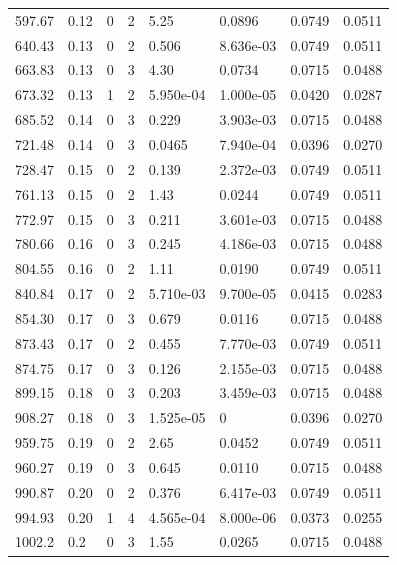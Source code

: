 \documentclass[preview]{standalone}
\begin{document}
{{{\begin{tabular}{L{1.2cm}C{1.2cm} C{0.3cm}C{0.5cm} C{1.4cm}C{1.4cm} C{1.4cm}C{1.4cm}}
  597.67  &  0.12  & 0     &  2 &  5.25  & 0.0896  & 0.0749 &  0.0511   \\ 
  640.43  &  0.13  & 0     &  2 &  0.506  & 8.636e-03  & 0.0749 &  0.0511   \\ 
  663.83  &  0.13  & 0     &  3 &  4.30  & 0.0734  & 0.0715 &  0.0488   \\ 
  673.32  &  0.13  & 1     &  2 &  5.950e-04  & 1.000e-05  & 0.0420 &  0.0287   \\ 
  685.52  &  0.14  & 0     &  3 &  0.229  & 3.903e-03  & 0.0715 &  0.0488   \\ 
  721.48  &  0.14  & 0     &  3 &  0.0465  & 7.940e-04  & 0.0396 &  0.0270   \\ 
  728.47  &  0.15  & 0     &  2 &  0.139  & 2.372e-03  & 0.0749 &  0.0511   \\ 
  761.13  &  0.15  & 0     &  2 &  1.43  & 0.0244  & 0.0749 &  0.0511   \\ 
  772.97  &  0.15  & 0     &  3 &  0.211  & 3.601e-03  & 0.0715 &  0.0488   \\ 
  780.66  &  0.16  & 0     &  3 &  0.245  & 4.186e-03  & 0.0715 &  0.0488   \\ 
  804.55  &  0.16  & 0     &  2 &  1.11  & 0.0190  & 0.0749 &  0.0511   \\ 
  840.84  &  0.17  & 0     &  2 &  5.710e-03  & 9.700e-05  & 0.0415 &  0.0283   \\ 
  854.30  &  0.17  & 0     &  3 &  0.679  & 0.0116  & 0.0715 &  0.0488   \\ 
  873.43  &  0.17  & 0     &  2 &  0.455  & 7.770e-03  & 0.0749 &  0.0511   \\ 
  874.75  &  0.17  & 0     &  3 &  0.126  & 2.155e-03  & 0.0715 &  0.0488   \\ 
  899.15  &  0.18  & 0     &  3 &  0.203  & 3.459e-03  & 0.0715 &  0.0488   \\ 
  908.27  &  0.18  & 0     &  3 &  1.525e-05  & 0  & 0.0396 &  0.0270   \\ 
  959.75  &  0.19  & 0     &  2 &  2.65  & 0.0452  & 0.0749 &  0.0511   \\ 
  960.27  &  0.19  & 0     &  3 &  0.645  & 0.0110  & 0.0715 &  0.0488   \\ 
  990.87  &  0.20  & 0     &  2 &  0.376  & 6.417e-03  & 0.0749 &  0.0511   \\ 
  994.93  &  0.20  & 1     &  4 &  4.565e-04  & 8.000e-06  & 0.0373 &  0.0255   \\ 
  1002.2  &   0.2  & 0     &  3 &  1.55  & 0.0265  & 0.0715 &  0.0488   \\ 

\end{tabular}}}}
\end{document}

